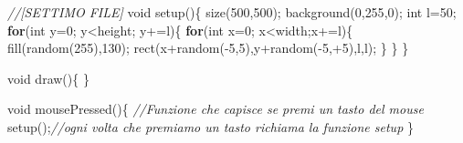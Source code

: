 \documentclass[
]{article}
\newenvironment{Shaded}{}{}
\newcommand{\CommentTok}[1]{\textcolor[rgb]{0.38,0.63,0.69}{\textit{#1}}}
\newcommand{\ControlFlowTok}[1]{\textcolor[rgb]{0.00,0.44,0.13}{\textbf{#1}}}
\newcommand{\DataTypeTok}[1]{\textcolor[rgb]{0.56,0.13,0.00}{#1}}
\newcommand{\DecValTok}[1]{\textcolor[rgb]{0.25,0.63,0.44}{#1}}
\newcommand{\FunctionTok}[1]{\textcolor[rgb]{0.02,0.16,0.49}{#1}}
\newcommand{\NormalTok}[1]{#1}
\newcommand{\OperatorTok}[1]{\textcolor[rgb]{0.40,0.40,0.40}{#1}}
\begin{document}
\begin{Shaded}
\begin{Highlighting}[]
\CommentTok{//[SETTIMO FILE]}
\DataTypeTok{void} \FunctionTok{setup}\OperatorTok{()\{}
\FunctionTok{size}\OperatorTok{(}\DecValTok{500}\OperatorTok{,}\DecValTok{500}\OperatorTok{);}
\FunctionTok{background}\OperatorTok{(}\DecValTok{0}\OperatorTok{,}\DecValTok{255}\OperatorTok{,}\DecValTok{0}\OperatorTok{);}
\DataTypeTok{int}\NormalTok{ l}\OperatorTok{=}\DecValTok{50}\OperatorTok{;}
\ControlFlowTok{for}\OperatorTok{(}\DataTypeTok{int}\NormalTok{ y}\OperatorTok{=}\DecValTok{0}\OperatorTok{;}\NormalTok{ y}\OperatorTok{\textless{}}\NormalTok{height}\OperatorTok{;}\NormalTok{ y}\OperatorTok{+=}\NormalTok{l}\OperatorTok{)\{}
  \ControlFlowTok{for}\OperatorTok{(}\DataTypeTok{int}\NormalTok{ x}\OperatorTok{=}\DecValTok{0}\OperatorTok{;}\NormalTok{ x}\OperatorTok{\textless{}}\NormalTok{width}\OperatorTok{;}\NormalTok{x}\OperatorTok{+=}\NormalTok{l}\OperatorTok{)\{}
    \FunctionTok{fill}\OperatorTok{(}\FunctionTok{random}\OperatorTok{(}\DecValTok{255}\OperatorTok{),}\DecValTok{130}\OperatorTok{);} 
    \FunctionTok{rect}\OperatorTok{(}\NormalTok{x}\OperatorTok{+}\FunctionTok{random}\OperatorTok{({-}}\DecValTok{5}\OperatorTok{,}\DecValTok{5}\OperatorTok{),}\NormalTok{y}\OperatorTok{+}\FunctionTok{random}\OperatorTok{({-}}\DecValTok{5}\OperatorTok{,+}\DecValTok{5}\OperatorTok{),}\NormalTok{l}\OperatorTok{,}\NormalTok{l}\OperatorTok{);}
    \OperatorTok{\}}
  \OperatorTok{\}}
\OperatorTok{\}}

\DataTypeTok{void} \FunctionTok{draw}\OperatorTok{()\{}
\OperatorTok{\}}

\DataTypeTok{void} \FunctionTok{mousePressed}\OperatorTok{()\{} \CommentTok{//Funzione che capisce se premi un tasto del mouse}
\FunctionTok{setup}\OperatorTok{();}\CommentTok{//ogni volta che premiamo un tasto richiama la funzione setup}
\OperatorTok{\}}
\end{Highlighting}
\end{Shaded}
\end{document}
